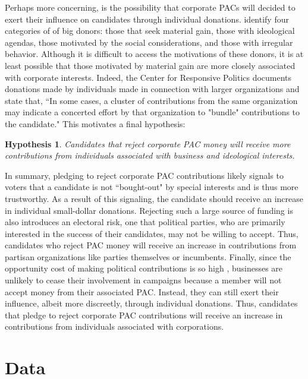 \documentclass[12pt]{article}
\newtheorem{hyp}{Hypothesis}
\begin{document}
 Perhaps more concerning, is the possibility that corporate PACs will decided to exert their influence on candidates through individual donations. \citet{francia2003} identify four categories of of big donors: those that seek material gain, those with ideological agendas, those motivated by the social considerations, and those with irregular behavior. Although it is difficult to access the motivations of these donors, it is at least possible that those motivated by material gain are more closely associated with corporate interests. Indeed, the Center for Responsive Politics documents donations made by individuals made in connection with larger organizations and state that, ``In some cases, a cluster of contributions from the same organization may indicate a concerted effort by that organization to "bundle" contributions to the candidate." This motivates a final hypothesis:
 
 \begin{hyp}
 	Candidates that reject corporate PAC money will receive more contributions from individuals associated with business and ideological interests. 
 \end{hyp}
 
 In summary, pledging to reject corporate PAC contributions likely signals to voters that a candidate is not ``bought-out" by special interests and is thus more trustworthy. As a result of this signaling, the candidate should receive an increase in individual small-dollar donations. Rejecting such a large source of funding is also introduces an electoral risk, one that political parties, who are primarily interested in the success of their candidates, may not be willing to accept. Thus, candidates who reject PAC money will receive an increase in contributions from partisan organizations like parties themselves or incumbents. Finally, since the opportunity cost of making political contributions is so high \citep{grier1991}, businesses are unlikely to cease their involvement in campaigns because a member will not accept money from their associated PAC. Instead, they can still exert their influence, albeit more discreetly, through individual donations. Thus, candidates that pledge to reject corporate PAC contributions will receive an increase in contributions from individuals associated with corporations.


\section{Data}
\end{document}
